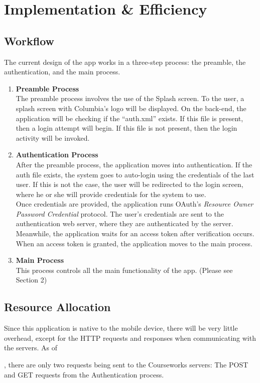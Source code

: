 \documentclass{article}
\begin{document}
\section{Implementation \& Efficiency}

\subsection{Workflow}
The current design of the app works in a three-step process: the preamble, the authentication, and the main process.
\begin{enumerate}
\item \textbf{Preamble Process} \\ 
The preamble process involves the use of the Splash screen. To the user, a splash screen with Columbia's logo will be displayed. On the back-end, the application will be checking if the ``auth.xml'' exists. If this file is present, then a login attempt will begin. If this file is not present, then the login activity will be invoked.
\item \textbf{Authentication Process} \\ 
After the preamble process, the application moves into authentication. If the auth file exists, the system goes to auto-login using the credentials of the last user. If this is not the case, the user will be redirected to the login screen, where he or she will provide credentials for the system to use. \\
Once credentials are provided, the application runs OAuth's \emph{Resource Owner Password Credential} protocol. The user's credentials are sent to the authentication web server, where they are authenticated by the server. Meanwhile, the application waits for an access token after verification occurs. When an access token is granted, the application moves to the main process.
\item \textbf{Main Process} \\ 
This process controls all the main functionality of the app. (Please see Section 2)
\end{enumerate}

\subsection{Resource Allocation}
Since this application is native to the mobile device, there will be very little 
overhead, except for the HTTP requests and responses when communicating with the 
servers. As of \date{\today}, there are only two requests being sent to the Courseworks servers: The POST and GET requests from the Authentication process.
\end{document}
